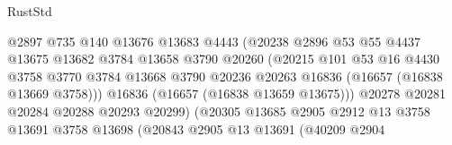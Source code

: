 \begin{lexlean}{RustStd}
\begin{coremodule}
                                        @2897
                                        @735
                                        @140
                                        @13676
                                        @13683
                                        @4443
                                        (@20238
                                          @2896
                                          @53
                                          @55
                                          @4437
                                          @13675
                                          @13682
                                          @3784
                                          @13658
                                          @3790
                                          @20260
                                          (@20215
                                            @101
                                            @53
                                            @16
                                            @4430
                                            @3758
                                            @3770
                                            @3784
                                            @13668
                                            @3790
                                            @20236
                                            @20263
                                            @16836
                                            (@16657 (@16838 @13669 @3758)))
                                          @16836
                                          (@16657 (@16838 @13659 @13675)))
                                        @20278
                                        @20281
                                        @20284
                                        @20288
                                        @20293
                                        @20299)
                                      (@20305
                                        @13685
                                        @2905
                                        @2912
                                        @13
                                        @3758
                                        @13691
                                        @3758
                                        @13698
                                        (@20843
                                          @2905
                                          @13
                                          @13691
                                          (@40209
                                            @2904

\end{coremodule}
\end{lexlean}
